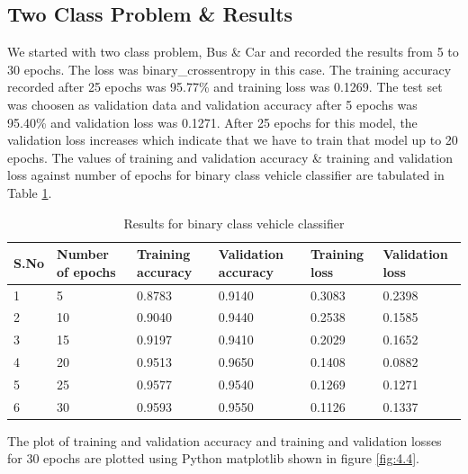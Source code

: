 \subsection{Two Class Problem \& Results}
We started with two class problem, Bus \& Car and recorded the results from 5
to 30 epochs.
The loss was binary\_crossentropy in this case. 
The training accuracy recorded after 25 epochs was 95.77\% and training
loss was 0.1269. The test set was choosen as validation data and validation accuracy after 5 epochs 
was 95.40\% and validation loss was 0.1271.
After 25 epochs for this model, the validation loss increases which indicate
that we have to train that model up to 20 epochs. The values of training
and validation accuracy \& training and validation loss
against number of epochs for binary class vehicle classifier
are tabulated in Table \ref{table:4.1}.
\begin{table}[H]
    \caption{Results for binary class vehicle classifier}
    \label{table:4.1}
	  \begin{center}
		\scalebox{0.85}
		{\begin{tabular}{|l |l |l |l |l |l |}
		\hline
		S.No & Number of epochs & Training accuracy & Validation accuracy & Training loss & Validation loss\\ \hline
		1  & 5 & 0.8783 & 0.9140 & 0.3083 & 0.2398
		\\ \hline
		2  & 10 & 0.9040 & 0.9440 & 0.2538 & 0.1585 
		\\ \hline
		3   & 15 & 0.9197  &  0.9410 & 0.2029 & 0.1652
        \\ \hline %
        4   & 20 &  0.9513 & 0.9650  &0.1408  & 0.0882
        \\ \hline %
        5   & 25 &  0.9577 & 0.9540  &0.1269  & 0.1271
        \\ \hline %
        6   & 30 &  0.9593 & 0.9550  &0.1126  & 0.1337
		\\ \hline %
		\end{tabular}}
	  \end{center}
\end{table}
\noindent The plot of training and validation accuracy and training and validation
losses for 30 epochs are plotted using Python matplotlib shown in figure \ref{fig:4.4}.
